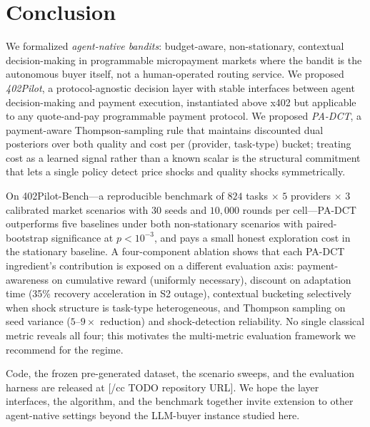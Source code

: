 \section{Conclusion}
\label{sec:conclusion}

We formalized \emph{agent-native bandits}: budget-aware, non-stationary, contextual decision-making in programmable micropayment markets where the bandit is the autonomous buyer itself, not a human-operated routing service. We proposed \emph{402Pilot}, a protocol-agnostic decision layer with stable interfaces between agent decision-making and payment execution, instantiated above x402 but applicable to any quote-and-pay programmable payment protocol. We proposed \emph{PA-DCT}, a payment-aware Thompson-sampling rule that maintains discounted dual posteriors over both quality and cost per (provider, task-type) bucket; treating cost as a learned signal rather than a known scalar is the structural commitment that lets a single policy detect price shocks and quality shocks symmetrically.

On 402Pilot-Bench---a reproducible benchmark of $824$ tasks $\times$ $5$ providers $\times$ $3$ calibrated market scenarios with $30$ seeds and $10{,}000$ rounds per cell---PA-DCT outperforms five baselines under both non-stationary scenarios with paired-bootstrap significance at $p<10^{-3}$, and pays a small honest exploration cost in the stationary baseline. A four-component ablation shows that each PA-DCT ingredient's contribution is exposed on a different evaluation axis: payment-awareness on cumulative reward (uniformly necessary), discount on adaptation time (35\% recovery acceleration in S2 outage), contextual bucketing selectively when shock structure is task-type heterogeneous, and Thompson sampling on seed variance ($5$--$9\times$ reduction) and shock-detection reliability. No single classical metric reveals all four; this motivates the multi-metric evaluation framework we recommend for the regime.

Code, the frozen pre-generated dataset, the scenario sweeps, and the evaluation harness are released at [/cc TODO repository URL]. We hope the layer interfaces, the algorithm, and the benchmark together invite extension to other agent-native settings beyond the LLM-buyer instance studied here.
